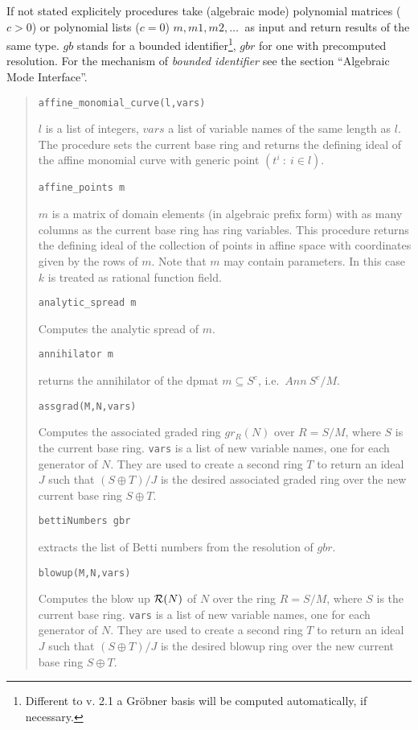\documentclass[a4paper,11pt]{article}
\newcommand{\gr}{Gr\"obner}
\newcommand{\ind}[1]{{\em #1}\index{#1}}
\newcommand{\pbx}[1]{\mbox{}\hfill \parbox[t]{12cm}{#1} \pagebreak[3]}
\begin{document}
If not stated explicitely procedures take (algebraic mode) polynomial
matrices ($c>0$) or polynomial lists ($c=0$) $m,m1,m2,\ldots\ $ as
input and return results of the same type. $gb$ stands for a bounded
identifier\footnote{Different to v. 2.1 a {\gr} basis will be computed
automatically, if necessary.}, $gbr$ for one with precomputed
resolution. For the mechanism of \ind{bounded identifier} see the
section ``Algebraic Mode Interface''.

\begin{quote}
\verb|affine_monomial_curve(l,vars)|

\pbx{$l$ is a list of integers, $vars$ a list of variable names of the
same length as $l$. The procedure sets the current base ring and
returns the defining ideal of the affine monomial curve with generic
point $(t^i\ :\ i\in l)$.}

\verb|affine_points m| 

\pbx{$m$ is a matrix of domain elements (in algebraic prefix form)
with as many columns as the current base ring has ring variables. This
procedure returns the defining ideal of the collection of points in
affine space with coordinates given by the rows of $m$. Note that $m$
may contain parameters. In this case $k$ is treated as rational
function field.} 

\verb|analytic_spread m|

\pbx{Computes the analytic spread of $m$.}
       
\verb|annihilator m| 

\pbx{returns the annihilator of the dpmat $m\subseteq S^c$, i.e.\
$Ann\ S^c/M$.}

\verb|assgrad(M,N,vars)|

\pbx{Computes the associated graded ring $gr_R(N)$ over $R=S/M$, where 
$S$ is the current
base ring. {\tt vars} is a list of new variable names, one for
each generator of $N$.  They are used to create a second ring $T$
to return an ideal $J$ such that $(S\oplus T)/J$ is the desired
associated graded ring over the new current base ring $S\oplus T$.}
       
\verb|bettiNumbers gbr| 

\pbx{extracts the list of Betti numbers from the resolution of $gbr$.}

\verb|blowup(M,N,vars)|

\pbx{Computes the blow up ${\cal R}(N)$ of $N$ over the ring $R=S/M$,
where $S$ is the current base ring. {\tt vars} is a list of new
variable names, one for each generator of $N$. They are used to create
a second ring $T$ to return an ideal $J$ such that $(S\oplus T)/J$ is
the desired blowup ring over the new current base ring $S\oplus T$.}
       

\end{quote}
\end{document}
